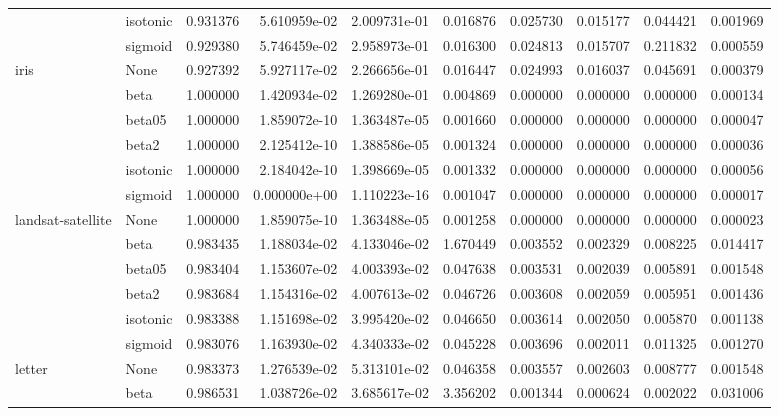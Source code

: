 \begin{tabular}{llrrrrrrrr}
        & isotonic &  0.931376 &  5.610959e-02 &  2.009731e-01 &   0.016876 &  0.025730 &  0.015177 &  0.044421 &  0.001969 \\
        & sigmoid &  0.929380 &  5.746459e-02 &  2.958973e-01 &   0.016300 &  0.024813 &  0.015707 &  0.211832 &  0.000559 \\
iris & None &  0.927392 &  5.927117e-02 &  2.266656e-01 &   0.016447 &  0.024993 &  0.016037 &  0.045691 &  0.000379 \\
        & beta &  1.000000 &  1.420934e-02 &  1.269280e-01 &   0.004869 &  0.000000 &  0.000000 &  0.000000 &  0.000134 \\
        & beta05 &  1.000000 &  1.859072e-10 &  1.363487e-05 &   0.001660 &  0.000000 &  0.000000 &  0.000000 &  0.000047 \\
        & beta2 &  1.000000 &  2.125412e-10 &  1.388586e-05 &   0.001324 &  0.000000 &  0.000000 &  0.000000 &  0.000036 \\
        & isotonic &  1.000000 &  2.184042e-10 &  1.398669e-05 &   0.001332 &  0.000000 &  0.000000 &  0.000000 &  0.000056 \\
        & sigmoid &  1.000000 &  0.000000e+00 &  1.110223e-16 &   0.001047 &  0.000000 &  0.000000 &  0.000000 &  0.000017 \\
landsat-satellite & None &  1.000000 &  1.859075e-10 &  1.363488e-05 &   0.001258 &  0.000000 &  0.000000 &  0.000000 &  0.000023 \\
        & beta &  0.983435 &  1.188034e-02 &  4.133046e-02 &   1.670449 &  0.003552 &  0.002329 &  0.008225 &  0.014417 \\
        & beta05 &  0.983404 &  1.153607e-02 &  4.003393e-02 &   0.047638 &  0.003531 &  0.002039 &  0.005891 &  0.001548 \\
        & beta2 &  0.983684 &  1.154316e-02 &  4.007613e-02 &   0.046726 &  0.003608 &  0.002059 &  0.005951 &  0.001436 \\
        & isotonic &  0.983388 &  1.151698e-02 &  3.995420e-02 &   0.046650 &  0.003614 &  0.002050 &  0.005870 &  0.001138 \\
        & sigmoid &  0.983076 &  1.163930e-02 &  4.340333e-02 &   0.045228 &  0.003696 &  0.002011 &  0.011325 &  0.001270 \\
letter & None &  0.983373 &  1.276539e-02 &  5.313101e-02 &   0.046358 &  0.003557 &  0.002603 &  0.008777 &  0.001548 \\
        & beta &  0.986531 &  1.038726e-02 &  3.685617e-02 &   3.356202 &  0.001344 &  0.000624 &  0.002022 &  0.031006 \\

\end{tabular}
